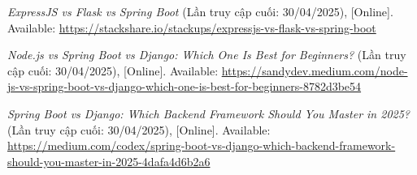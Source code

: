 \documentclass[12pt, a4paper]{article}
\begin{document}
\begin{thebibliography}{}
	 \textit{ExpressJS vs Flask vs Spring Boot} (Lần truy cập cuối: 30/04/2025), [Online]. Available: \url{https://stackshare.io/stackups/expressjs-vs-flask-vs-spring-boot}

	 \textit{Node.js vs Spring Boot vs Django: Which One Is Best for Beginners?} (Lần truy cập cuối: 30/04/2025), [Online]. Available: \url{https://sandydev.medium.com/node-js-vs-spring-boot-vs-django-which-one-is-best-for-beginners-8782d3be54}

	 \textit{Spring Boot vs Django: Which Backend Framework Should You Master in 2025?} (Lần truy cập cuối: 30/04/2025), [Online]. Available: \url{https://medium.com/codex/spring-boot-vs-django-which-backend-framework-should-you-master-in-2025-4dafa4d6b2a6}
\end{thebibliography}

% 
\end{document}

